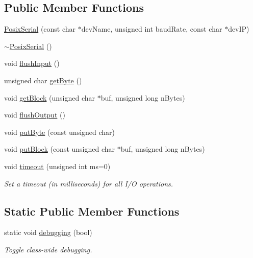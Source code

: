 \subsection*{\-Public \-Member \-Functions}
\begin{DoxyCompactItemize}
\item 
\hyperlink{classmetrobotics_1_1PosixSerial_ade0a15c42ab070c85ce4cf9b3747f17b}{\-Posix\-Serial} (const char $\ast$dev\-Name, unsigned int baud\-Rate, const char $\ast$dev\-I\-P)
\item 
\hyperlink{classmetrobotics_1_1PosixSerial_a46a1dca8714afcf0b5ec9498b02dd5a8}{$\sim$\-Posix\-Serial} ()
\item 
void \hyperlink{classmetrobotics_1_1PosixSerial_aa0a3298fc067b03e62154ccbe6bd276e}{flush\-Input} ()
\item 
unsigned char \hyperlink{classmetrobotics_1_1PosixSerial_aeeacb8383b543a5354b8663254205727}{get\-Byte} ()
\item 
void \hyperlink{classmetrobotics_1_1PosixSerial_a3174f9e2382efbbc53795565314e6030}{get\-Block} (unsigned char $\ast$buf, unsigned long n\-Bytes)
\item 
void \hyperlink{classmetrobotics_1_1PosixSerial_a44eb4e702e0c08f3f354e9c19e9cef8a}{flush\-Output} ()
\item 
void \hyperlink{classmetrobotics_1_1PosixSerial_ac77d22c91d44f80782e8c6f2a5070f52}{put\-Byte} (const unsigned char)
\item 
void \hyperlink{classmetrobotics_1_1PosixSerial_abc2a8fd6b268ea5993590d099ad6ba80}{put\-Block} (const unsigned char $\ast$buf, unsigned long n\-Bytes)
\item 
void \hyperlink{classmetrobotics_1_1PosixSerial_a7650234ceea8ddb92e35be4f4811bd63}{timeout} (unsigned int ms=0)
\begin{DoxyCompactList}\small\item\em \-Set a timeout (in milliseconds) for all \-I/\-O operations. \end{DoxyCompactList}\end{DoxyCompactItemize}
\subsection*{\-Static \-Public \-Member \-Functions}
\begin{DoxyCompactItemize}
\item 
static void \hyperlink{classmetrobotics_1_1PosixSerial_a6a790d35488736c052dc580baf2a6391}{debugging} (bool)
\begin{DoxyCompactList}\small\item\em \-Toggle class-\/wide debugging. \end{DoxyCompactList}\end{DoxyCompactItemize}
